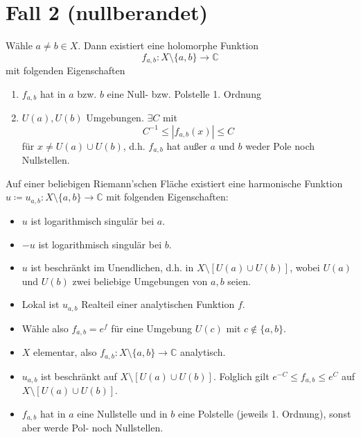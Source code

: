 \documentclass{beamer}
\newcommand{\C}{\mathbb{C}}
\begin{document}
    \section{Fall 2 (nullberandet)}
    \begin{frame}
        \begin{lemma}
            Wähle $a\neq b \in X$. Dann existiert eine holomorphe Funktion 
            $$f_{a,b} \colon X \setminus \{a,b\} \to \C$$ mit folgenden Eigenschaften
            \begin{enumerate}
                \item $f_{a,b}$ hat in $a$ bzw. $b$ eine Null- bzw. Polstelle 1. Ordnung
                \item $U(a), U(b)$ Umgebungen. $\exists C$ mit $$C^{-1} \leq |f_{a,b}(x)| \leq C$$ für $x \neq U(a) \cup U(b)$, d.h. $f_{a,b}$ hat außer $a$ und $b$ weder Pole noch Nullstellen.
            \end{enumerate}
        \end{lemma}
    \end{frame}
    \begin{frame}
        \begin{lemma}
            Auf einer beliebigen Riemann'schen Fläche existiert eine harmonische Funktion $u \coloneqq u_{a,b} \colon X \setminus \{a, b\} \to \C$ mit folgenden Eigenschaften:
            \begin{itemize}
                \item $u$ ist logarithmisch singulär bei $a$.
                \item $-u$ ist logarithmisch singulär bei $b$.
                \item $u$ ist beschränkt im Unendlichen, d.h. in $X \setminus [U (a) \cup U (b)]$, wobei $U(a)$ und $U(b)$ zwei beliebige Umgebungen von $a, b$ seien.
            \end{itemize}
        \end{lemma}
    \end{frame}
    \begin{frame}
        \begin{itemize}
            \item Lokal ist $u_{a,b}$ Realteil einer analytischen Funktion $f$. 
            \item Wähle also $f_{a,b} = e^f$ für eine Umgebung $U(c)$ mit $c \notin \{a,b\}$.
            \item $X$ elementar, also $f_{a,b} \colon X\setminus \{a,b\} \to \C$ analytisch.
            \item $u_{a,b}$ ist beschränkt auf $X \setminus [U (a) \cup U (b)]$. Folglich gilt 
            $e^{-C} \leq f_{a,b} \leq e^C$ auf $X \setminus [U (a) \cup U (b)]$.
            \item $f_{a,b}$ hat in $a$ eine Nullstelle und in $b$ eine Polstelle (jeweils 1. Ordnung), sonst aber werde Pol- noch Nullstellen.
        \end{itemize}
    \end{frame}
\end{document}
